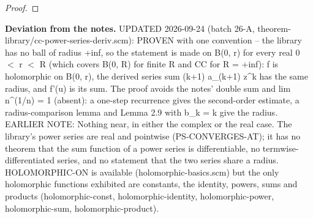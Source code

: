 \begin{proof}
%
%
\end{proof}
%
\noindent\textbf{Deviation from the notes.} UPDATED 2026-09-24 (batch 26-A, theorem-library/cc-power-series-deriv.scm): PROVEN with one convention -- the library has no ball of radius +inf, so the statement is made on B(0, r) for every real 0 $<$ r $<$ R (which covers B(0, R) for finite R and CC for R = +inf): f is holomorphic on B(0, r), the derived series sum (k+1) a\_(k+1) z\textasciicircum{}k has the same radius, and f'(u) is its sum. The proof avoids the notes' double sum and lim n\textasciicircum{}(1/n) = 1 (absent): a one-step recurrence gives the second-order estimate, a radius-comparison lemma and Lemma 2.9 with b\_k = k give the radius. EARLIER NOTE: Nothing near, in either the complex or the real case. The library's power series are real and pointwise (PS-CONVERGES-AT); it has no theorem that the sum function of a power series is differentiable, no termwise-differentiated series, and no statement that the two series share a radius. HOLOMORPHIC-ON is available (holomorphic-basics.scm) but the only holomorphic functions exhibited are constants, the identity, powers, sums and products (holomorphic-const, holomorphic-identity, holomorphic-power, holomorphic-sum, holomorphic-product).
